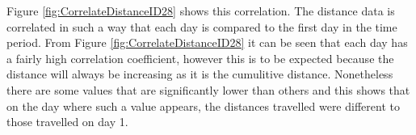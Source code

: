 \noindent Figure \ref{fig:CorrelateDistanceID28} shows this correlation. The distance data is correlated in such a way that each day is compared to the first day in the time period. From Figure \ref{fig:CorrelateDistanceID28}  it can be seen that each day has a fairly high correlation coefficient, however this is to be expected because the distance will always be increasing as it is the cumulitive distance. Nonetheless there are some values that are significantly lower than others and this shows that on the day where such a value appears, the distances travelled were different to those travelled on day 1. \\ 
